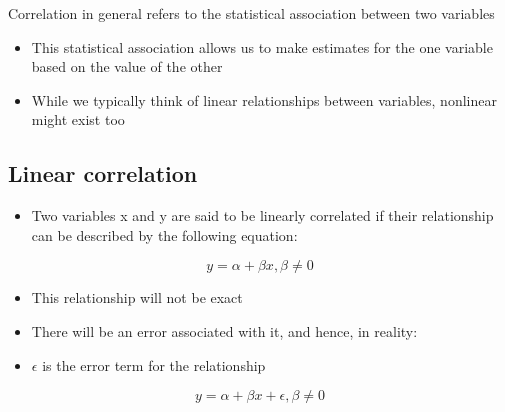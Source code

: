 \documentclass[11pt]{article}
\theoremstyle{definition}
\begin{document}
Correlation in general refers to the statistical
association between two variables
\begin{itemize}
  \item This statistical association allows us to make
  estimates for the one variable based on the value of
  the other
  \item While we typically think of linear relationships
  between variables, nonlinear might exist too
\end{itemize}
\subsection{Linear correlation}
\begin{itemize}
  \item Two variables x and y are said to be
  linearly correlated if their relationship can
  be described by the following equation:
\end{itemize}
\begin{equation}
  y = \alpha + \beta x, \beta \neq 0
\end{equation}
\begin{itemize}
  \item This relationship will not be exact
  \item There will be an error associated with it, and
  hence, in reality:
  \item $\epsilon$ is the error term for the relationship
\end{itemize}
\begin{equation}
  y = \alpha + \beta x + \epsilon, \beta \neq 0
\end{equation}
\end{document}
